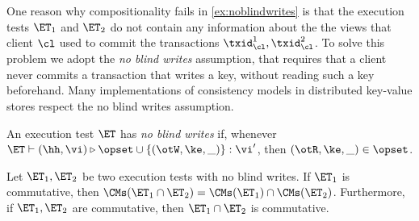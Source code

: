 {\color{red} One reason why compositionality fails in \cref{ex:noblindwrites} is that the execution tests $\ET_1$ and $\ET_2$ do not contain 
any information about the the views that client $\cl$ used to commit the transactions $\txid_{\cl}^1, \txid_{\cl}^2$. 
To solve this problem we adopt the \emph{no blind writes} assumption, that requires that a client never commits 
a transaction that writes a key, without reading such a key beforehand. Many implementations of consistency models 
in distributed key-value stores respect the no blind writes assumption. 


\begin{definition}
\label{def:noblidwrites}
An execution test $\ET$ has \emph{no blind writes} if, whenever $\ET \vdash (\hh, \vi) \triangleright \opset \cup \{(\otW, \ke, \_)\} : \vi'$, 
then $(\otR, \ke, \_) \in \opset$.
\end{definition}

\begin{theorem}
Let $\ET_1, \ET_2$ be two execution tests with no blind writes. If $\ET_1$ is commutative, 
then $\CMs(\ET_1 \cap \ET_2) = \CMs(\ET_1) \cap \CMs(\ET_2)$. 
Furthermore, if $\ET_1, \ET_2$ are commutative, then $\ET_1 \cap \ET_2$ 
is commutative.
\end{theorem}
}


